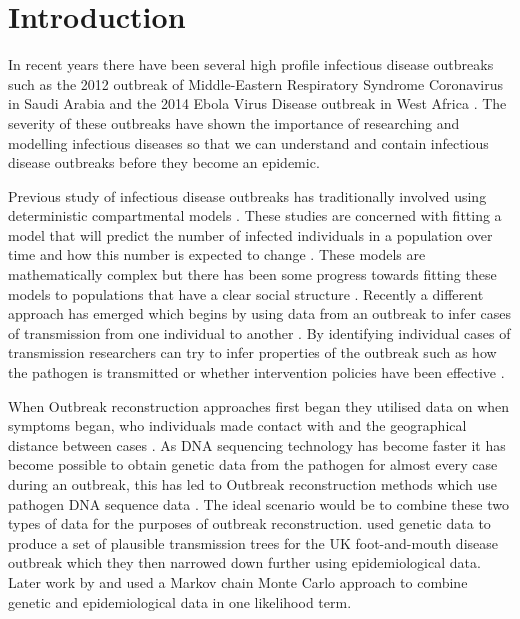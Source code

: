 \documentclass[11pt,a4paper]{report}
\begin{document}
\newpage

\tableofcontents
\pagestyle{plain}
\newpage


\chapter{Introduction}
In recent years there have been several high profile infectious disease outbreaks such as the 2012 outbreak of Middle-Eastern Respiratory Syndrome Coronavirus in Saudi Arabia \citep{MERS} and the 2014 Ebola Virus Disease outbreak in West Africa \citep{Ebola14}. The severity of these outbreaks have shown the importance of researching and modelling infectious diseases so that we can understand and contain infectious disease outbreaks before they become an epidemic.

Previous study of infectious disease outbreaks has traditionally involved using deterministic compartmental models \citep{Anderson92}. These studies are concerned with fitting a model that will predict the number of infected individuals in a population over time and how this number is expected to change \citep{Breban07}. These models are mathematically complex but there has been some progress towards fitting these models to populations that have a clear social structure \citep{Ball01}. Recently a different approach has emerged which begins by using data from an outbreak to infer cases of transmission from one individual to another \citep{Teunis13,outbrkr}. By identifying individual cases of transmission researchers can try to infer properties of the outbreak such as how the pathogen is transmitted \citep{Ypmawind} or whether intervention policies have been effective \citep{Ferguson01}.

When Outbreak reconstruction approaches first began they utilised data on when symptoms began, who individuals made contact with and the geographical distance between cases \citep{Haydon03,Ferguson01}. As DNA sequencing technology has become faster \citep{Koser12} it has become possible to obtain genetic data from the pathogen for almost every case during an outbreak, this has led to Outbreak reconstruction methods which use pathogen DNA sequence data \citep{Snitkin12}. The ideal scenario would be to combine these two types of data for the purposes of outbreak reconstruction. \citet{Cottam08} used genetic data to produce a set of plausible transmission trees for the UK foot-and-mouth disease outbreak which they then narrowed down further using epidemiological data. Later work by \citet{Ypma12} and \citet{Morelli12} used a Markov chain Monte Carlo approach to combine genetic and epidemiological data in one likelihood term.
\end{document}
